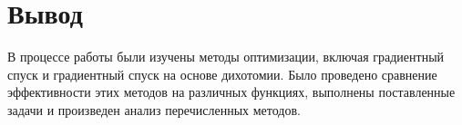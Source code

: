 \documentclass[12pt, a4paper]{article}
\begin{document}
\section{Вывод}
В процессе работы были изучены методы оптимизации, включая градиентный спуск и градиентный спуск на основе дихотомии. Было проведено сравнение эффективности этих методов на различных функциях, выполнены поставленные задачи и произведен анализ перечисленных методов.
\end{document}
